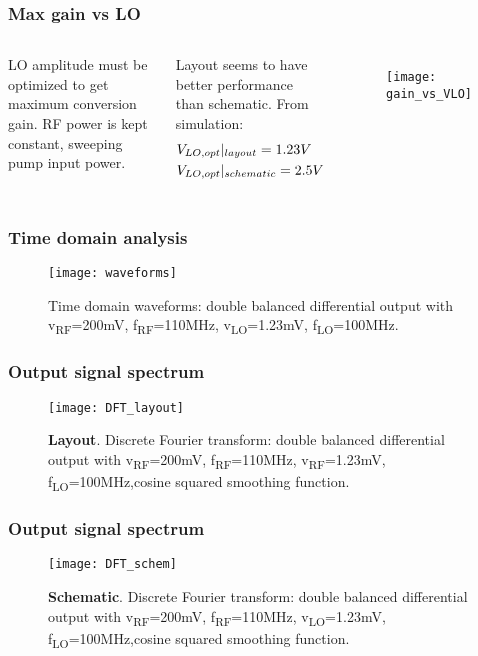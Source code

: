 \begin{frame}
\frametitle{Max gain vs LO}
\begin{columns}
	LO amplitude must be optimized to get maximum conversion gain. RF power is kept constant, sweeping pump input power.
	
	Layout seems to have better performance than schematic. From simulation:
	\begin{align}
	&V_{LO,opt}|_{layout}=1.23V \notag \\
	&V_{LO,opt}|_{schematic}=2.5V \notag
	\end{align}
	\begin{figure}[H]
		\centering
		\texttt{[image: gain\_vs\_VLO]}
		\label{fig:maxGainvsLO}
	\end{figure}
\end{columns}
\end{frame}

\begin{frame}
\frametitle{Time domain analysis}

	\begin{figure}[H]
		\centering
		\texttt{[image: waveforms]}
		\caption{Time domain waveforms: double balanced differential output with v\textsubscript{RF}=200mV,  f\textsubscript{RF}=110MHz, v\textsubscript{LO}=1.23mV, f\textsubscript{LO}=100MHz.}
		\label{fig:TdomaniWF}
	\end{figure}

\end{frame}

\begin{frame}
\frametitle{Output signal spectrum}
	\begin{figure}[H]
		\centering
		\texttt{[image: DFT\_layout]}
		\caption{\textbf{Layout}. Discrete Fourier transform: double balanced differential output with v\textsubscript{RF}=200mV,  f\textsubscript{RF}=110MHz, v\textsubscript{RF}=1.23mV, f\textsubscript{LO}=100MHz,cosine squared smoothing function.}
	\end{figure}
\end{frame}

\begin{frame}
\frametitle{Output signal spectrum}
	\begin{figure}[H]
	\centering
	\texttt{[image: DFT\_schem]}
	\caption{\textbf{Schematic}. Discrete Fourier transform: double balanced differential output with v\textsubscript{RF}=200mV,  f\textsubscript{RF}=110MHz, v\textsubscript{LO}=1.23mV, f\textsubscript{LO}=100MHz,cosine squared smoothing function.}
	\end{figure}
\end{frame}

